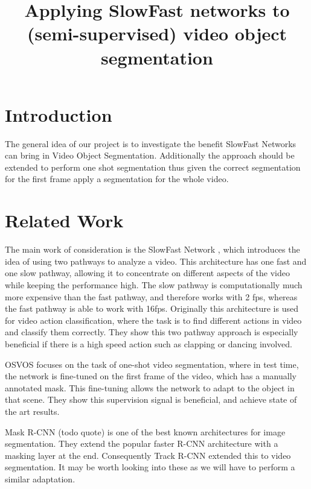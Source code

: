 \documentclass[conference]{IEEEtran}
\begin{document}
\title{Applying SlowFast networks to (semi-supervised) video object segmentation\\
}

\author{
\and
{}
}
\maketitle

\section{Introduction}
The general idea of our project is to investigate the benefit SlowFast Networks \cite{slow_fast} can bring in Video Object Segmentation. Additionally the approach should be extended to perform one shot segmentation thus given the correct segmentation for the first frame apply a segmentation for the whole video. 

\section{Related Work}
The main work of consideration is the SlowFast Network \cite{slow_fast}, which introduces the idea of using two pathways to analyze a video. This architecture has one fast and one slow pathway, allowing it to concentrate on different aspects of the video while keeping the performance high. The slow pathway is computationally much more expensive than the fast pathway, and therefore works with 2 fps, whereas the fast pathway is able to work with 16fps. Originally this architecture is used for video action classification, where the task is to find different actions in video and classify them correctly. They show this two pathway approach is especially beneficial if there is a high speed action such as clapping or dancing involved.  

OSVOS \cite{osvos} focuses on the task of one-shot video segmentation, where in test time, the network is fine-tuned on the first frame of the video, which has a manually annotated mask. This fine-tuning allows the network to adapt to the object in that scene. They show this supervision signal is beneficial, and achieve state of the art results.


Mask R-CNN (todo quote) is one of the best known architectures for image segmentation. They extend the popular faster R-CNN architecture with a masking layer at the end. Consequently Track R-CNN extended this to video segmentation. It may be worth looking into these as we will have to perform a similar adaptation.
\end{document}
